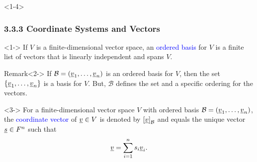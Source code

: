 \documentclass[10pt,english,aspectratio=169]{beamer}
\begin{document}
\begin{frame}<1-4> \frametitle{3.3.3 Coordinate Systems and Vectors}

\vspace{-1mm}

\begin{definition}<1->
If $V$ is a finite-dimensional vector space, an \textcolor{blue}{ordered basis} for $V$ is a finite list of vectors that is linearly independent and spans $V$.
\end{definition}

\begin{exampleblock}{Remark}<2->
If $\mathcal{B} = (\underline{v}_1, \ldots, \underline{v}_n )$ is an ordered basis for $V$, then the set $\left\{ \underline{v}_1, \ldots, \underline{v}_n \right\}$ is a basis for $V$.
But, $\mathcal{B}$ defines the set and a specific ordering for the vectors.
\end{exampleblock}

\begin{definition}<3->
For a finite-dimensional vector space $V$ with ordered basis $\mathcal{B}=(\underline{v}_1, \ldots, \underline{v}_n )$, the \textcolor{blue}{coordinate vector} of $\underline{v} \in V$ is denoted by $\left[ \underline{v} \right]_{\mathcal{B}}$ and equals the unique vector $\underline{s} \in F^n$ such that \vspace{-1mm}
\[ \underline{v} = \sum_{i=1}^n s_i \underline{v}_i. \]  
\end{definition}

\vspace{-0.5mm}



\end{frame}
\end{document}
